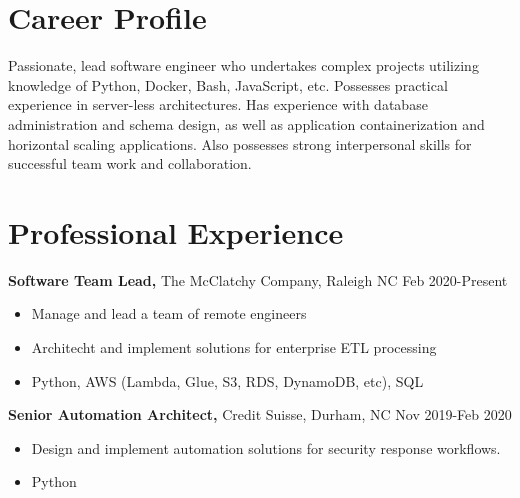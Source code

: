 \documentclass{res}
\begin{document}
 
 
\address{{\bf Present Address} \\ 5973 Dixon Dr. \\ Raleigh, NC 27609  \\
        (336) 681-7224 }
\address{{\bf Permanent Address} \\ 114 East Keeling Rd \\ Greensboro, NC 27410}
 
\begin{resume} 

\noindent\makebox[5.5in]{\rule{6.5in}{0.4pt}}


\section{Career Profile} 
  Passionate, lead software engineer who undertakes complex projects utilizing knowledge of Python, Docker, Bash, JavaScript, etc. Possesses practical experience in server-less architectures. Has experience with database administration and schema design, as well as application containerization and horizontal scaling applications. Also possesses strong interpersonal skills for successful team work and collaboration.
\section{Professional Experience}
  {\bf Software Team Lead,} The McClatchy Company, Raleigh NC \hfill Feb 2020-Present
    \begin{itemize} \itemsep -2pt
      \item Manage and lead a team of remote engineers
      \item Architecht and implement solutions for enterprise ETL processing
      \item Python, AWS (Lambda, Glue, S3, RDS, DynamoDB, etc), SQL
    \end{itemize}

  {\bf Senior Automation Architect,} Credit Suisse, Durham, NC \hfill Nov 2019-Feb 2020
    \begin{itemize} \itemsep -2pt
      \item Design and implement automation solutions for security response workflows.
      \item Python
    \end{itemize}


\end{resume}
\end{document}
